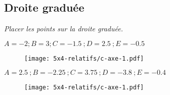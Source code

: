 \subsection*{Droite graduée}

\textit{Placer les points sur la droite graduée.}

$A = -2 ; B = 3 ; C = \SI{-1,5}{} ; D = \SI{2,5}{} ; E = \SI{-0,5}{}$

\begin{figure}[H]
  \centering
  \texttt{[image: 5x4-relatifs/c-axe-1.pdf]}
\end{figure}

$A = \SI{2,5}{} ; B = \SI{-2,25}{} ; C = \SI{3,75}{} ; D = \SI{-3,8}{} ; E = \SI{-0,4}{}$

\begin{figure}[H]
  \centering
  \texttt{[image: 5x4-relatifs/c-axe-1.pdf]}
\end{figure}

